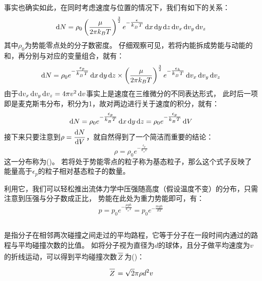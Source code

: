             事实也确实如此，在同时考虑速度与位置的情况下，我们有如下的关系：
            \begin{equation}
                \dif{N}=\rho_{0}\left(\frac \mu{2\pi k_{B}T}\right)^{\frac{3}{2}}e^{-\tfrac{\epsilon}{k_{_B}T}}
                \dif{x}\dif{y}\dif{z}\dif{v_{x}}\dif{v_{y}}\dif{v_{z}}
                \nonumber
            \end{equation}
            其中$\rho_{0}$为势能零点处的分子数密度。
            仔细观察可见，若将内能拆成势能与动能的和，再分别与对应的变量组合，就有：
            \begin{equation}
                \dif{N} =\rho_{0}e^{-\tfrac{\epsilon_{p}}{k_{_B}T}}\dif{x}\dif{y}\dif{z}\times\left(\frac \mu{2\pi k_{B}T}\right)^{\frac{3}{2}}e^{-\tfrac{\epsilon_{k}}{k_{_B}T}}
                \dif{v_{x}}\dif{v_{y}}\dif{v_{z}}
                \nonumber
            \end{equation}
            由于$\dif{v_{x}}\dif{v_{y}}\dif{v_{z}}=4\pi v^{2}\dif{v}$事实上是速度在三维微分的不同表达形式，
            此时后一项即是麦克斯韦分布，积分为1，故对两边进行关于速度的积分，就有：
            \begin{equation}
                \dif{N} =\rho_{0}e^{-\tfrac{\epsilon_{p}}{k_{_B}T}}\dif{x}\dif{y}\dif{z} =\rho_{0}e^{-\tfrac{\epsilon_{p}}{k_{_B}T}}\dif{V}
                \nonumber
            \end{equation}
            接下来只要注意到$\rho = \dfrac{\dif{N}}{\dif{V}}$，就自然得到了一个简洁而重要的结论：
            \begin{equation}
                \rho = \rho_{0}e^{-\tfrac{\epsilon_{p}}{k_{_B}T}}
                \nonumber
            \end{equation}
            这一分布称为()。
            若将处于势能零点的粒子称为基态粒子，那么这个式子反映了能量高于$\epsilon_{p}$的粒子相对基态粒子的数量。
            
            利用它，我们可以轻松推出流体力学中压强随高度（假设温度不变）的分布，只需注意到压强与分子数成正比，
            势能在此处为重力势能即可，有：
            \begin{equation}
                p = p_{0}e^{-\tfrac{\mu gh}{k_{_B}T}} = p_{0}e^{-\tfrac{mgh}{RT}}
                \nonumber    
            \end{equation}
        \subsection[平均自由程]{}
            是指分子在相邻两次碰撞之间走过的平均路程，它等于分子在一段时间内通过的路程与平均碰撞次数的比值。
            如将分子视为直径为$d$的球体，且分子做平均速度为$v$的折线运动，可以得到平均碰撞次数$\upperline{Z}$为()：
            \begin{equation}
                \upperline{Z} = \sqrt{2}\pi \rho d^{2} v
                \nonumber
            \end{equation}

